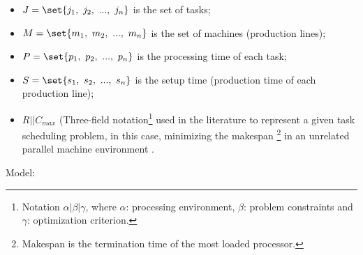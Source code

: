 \documentclass[conference,harvard,brazil,english]{sbatex}
\begin{document}
\begin{itemize}
\item $J = \set{j_1,~j_2,~...,~j_n}$ is the set of tasks;
\item $M = \set{m_1,~m_2,~...,~m_n}$ is the set of machines (production lines);
\item $P = \set{p_1,~p_2,~...,~p_n}$ is the processing time of each task;
\item $S = \set{s_1,~s_2,~...,~s_n}$ is the setup time (production time of each production line);
\item $R||C_{max}$ (Three-field notation\footnote{Notation $\alpha | \beta | \gamma$, where $\alpha$: processing environment, $\beta$: problem constraints and $\gamma$: optimization criterion.} used in the literature to represent a given task scheduling problem, in this case, minimizing the makespan \footnote{Makespan is the termination time of the most loaded processor.} in an unrelated parallel machine environment \cite{graham1979optimization}.
\end{itemize}

Model:
\end{document}
